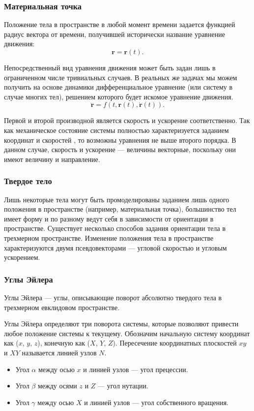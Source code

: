 \subsubsection{Материальная точка}
Положение тела в пространстве в любой момент времени задается функцией радиус вектора от
времени, получившей исторически название уравнение движения:
\begin{equation}
 \mathbf{r}=\mathbf{r}(t).
\end{equation}

Непосредственный вид уравнения движения может быть задан лишь в ограниченном числе 
тривиальных случаев. В реальных же задачах мы можем получить на основе динамики 
дифференциальное уравнение (или систему в случае многих тел), решением которого
будет искомое уравнение движения.
\begin{equation}
 \ddot{\mathbf{r}}=f(t, \mathbf{r}(t), \dot{\mathbf{r}}(t)).
\end{equation}

Первой и второй производной является скорость и ускорение соответственно.
Так как механическое состояние системы полностью характеризуется заданием координат
и скоростей \cite[10]{Landau1}, то возможны уравнения не выше второго порядка. 
В данном случае, скорость и ускорение --- величины векторные, поскольку они имеют величину и направление.

\subsubsection{Твердое тело}
Лишь некоторые тела могут быть промоделированы заданием лишь одного положения в пространстве 
(например, материальная точка), большинство тел имеет форму и по разному ведут себя в зависимости
от ориентации в пространстве. Существует несколько способов задания ориентации тела в трехмерном
пространстве. Изменение положения тела в пространстве характеризуются двумя псевдовекторами ---
угловой скоростью и угловым ускорением.
\subsubsection{Углы Эйлера}
Углы Эйлера --- углы, описывающие поворот абсолютно твердого тела в трехмерном евклидовом пространстве.

Углы Эйлера определяют три поворота системы\cite[79]{Berezkin}, которые позволяют привести любое положение системы к текущему.
Обозначим начальную систему координат как ($x$, $y$, $z$), конечную как ($X$, $Y$, $Z$).
Пересечение координатных плоскостей $xy$ и $XY$ называется линией узлов $N$.
\begin{itemize}
  \item Угол $\alpha$ между осью $x$ и линией узлов --- угол прецессии.
  \item Угол $\beta$ между осями $z$ и $Z$ --- угол нутации.
  \item Угол $\gamma$ между осью $X$ и линией узлов --- угол собственного вращения.
\end{itemize}
  
